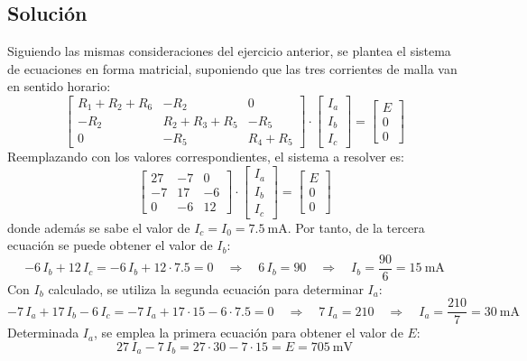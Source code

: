 \subsection*{Solución}
Siguiendo las mismas consideraciones del ejercicio anterior, se plantea el sistema de ecuaciones en forma matricial, suponiendo que
las tres corrientes de malla van en sentido horario:
\begin{equation*}
  \begin{bmatrix}
    R_1+R_2+R_6 & -R_2 & 0 \\
    -R_2 & R_2+R_3+R_5 & -R_5 \\
    0 & -R_5 & R_4+R_5
  \end{bmatrix} \cdot
  \begin{bmatrix}
    I_a\\
    I_b\\
    I_c
  \end{bmatrix} = %
  \begin{bmatrix}
    E \\
    0\\
    0
  \end{bmatrix}
\end{equation*}
Reemplazando con los valores correspondientes, el sistema a resolver es:
\begin{equation*}
  \begin{bmatrix}
    27 & -7 & 0 \\
    -7 & 17 & -6 \\
    0 & -6 & 12
  \end{bmatrix} \cdot
  \begin{bmatrix}
    I_a\\
    I_b\\
    I_c
  \end{bmatrix} = %
  \begin{bmatrix}
    E \\
    0\\
    0
  \end{bmatrix}
\end{equation*}
donde además se sabe el valor de $I_c=I_0=\qty{7.5}{\milli\ampere}$. Por
tanto, de la tercera ecuación se puede obtener el valor de $I_b$:
\begin{equation*}
  -6\,I_b+12\,I_c=-6\,I_b+12\cdot 7.5 = 0 \quad \Rightarrow \quad 6\,I_b=90 \quad \Rightarrow \quad I_b=\dfrac{90}{6}=\qty{15}{\milli\ampere}
\end{equation*}
Con $I_b$ calculado, se utiliza la segunda ecuación para determinar
$I_a$:
\begin{equation*}
  -7\,I_a+17\,I_b-6\,I_c=-7\,I_a+17\cdot 15-6\cdot 7.5 = 0\quad \Rightarrow \quad 7\,I_a=210\quad \Rightarrow \quad I_a=\dfrac{210}{7}=\qty{30}{\milli\ampere}
\end{equation*}
Determinada $I_a$, se emplea la primera ecuación para obtener el valor
de $E$:
\begin{equation*}
  27\,I_a-7\,I_b=27\cdot 30 - 7 \cdot 15 = E = {\qty{705}{\milli\volt}}
\end{equation*}


